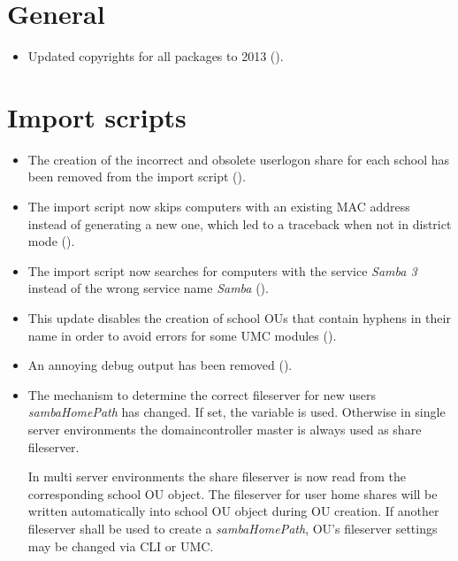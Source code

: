 \section{General}
\begin{itemize}
\item Updated copyrights for all packages to 2013 ().
\end{itemize}

\section{Import scripts}
\begin{itemize}

\item The creation of the incorrect and obsolete userlogon share for
  each school has been removed from the  import script
  ().

\item The  import script now skips computers with an
  existing MAC address instead of generating a new one, which led to
  a traceback when not in district mode ().

\item The  import script now searches for computers with
  the service \emph{Samba 3} instead of the wrong service name \emph{Samba}
  ().

\item This update disables the creation of school OUs that contain
  hyphens in their name in order to avoid errors for some UMC modules
  ().

\item An annoying debug output has been removed ().

\item The mechanism to determine the correct fileserver for new users \emph{sambaHomePath} has changed. If
  set, the \ucsUCR{} variable  is used. Otherwise in single server environments the
  domaincontroller master is always used as share fileserver.

  In multi server environments the share fileserver is now read from the corresponding school OU object. The
  fileserver for user home shares will be written automatically into school OU object during OU creation. If
  another fileserver shall be used to create a \emph{sambaHomePath}, OU's fileserver settings may be changed
  via CLI or UMC.


\end{itemize}
